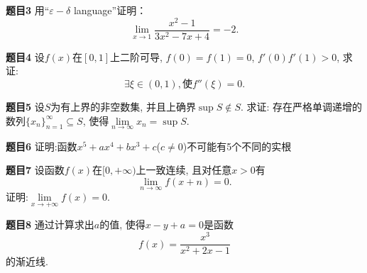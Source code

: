 \documentclass[aspectratio=43]{beamer}
\begin{document}
\begin{frame}{\textbf{题目3}}
	用“$\varepsilon-\delta$ language”证明：\begin{equation*}
	\lim_{x\to 1}\frac{x^2-1}{3x^2-7x+4} = -2.
	\end{equation*}
\end{frame}

\begin{frame}{\textbf{题目4}}
	设$f(x)$在$[0,1]$上二阶可导, $f(0) = f(1) = 0$, $f'(0)f'(1)>0$, 求证:
	\begin{equation*}
	\exists \xi\in(0,1), \text{使}f''(\xi) = 0.
	\end{equation*}
\end{frame}

\begin{frame}{\textbf{题目5}}
	设$S$为有上界的非空数集, 并且上确界$\sup S\notin S$. 求证: 存在严格单调递增的数列$\{x_n\}_{n=1}^{\infty}\subseteq S$, 使得$\lim\limits_{n\to\infty}x_n = \sup S$.
	
\end{frame}

\begin{frame}{\textbf{题目6}}
	证明:函数$x^5+ax^4+bx^3+c$($c\neq 0$)不可能有5个不同的实根
	
\end{frame}

\begin{frame}{\textbf{题目7}}
	设函数$f(x)$在$[0,+\infty)$上一致连续, 且对任意$x>0$有
	\begin{equation}
	\lim_{n\to\infty}f(x+n) = 0.
	\end{equation}
	证明:$\lim\limits_{x\to+\infty}f(x) = 0$.
	
\end{frame}

\begin{frame}{\textbf{题目8}}
	通过计算求出$a$的值, 使得$x-y+a = 0$是函数
	\begin{equation*}
	f(x) = \frac{x^3}{x^2+2x-1}
	\end{equation*}
	的渐近线.
\end{frame}
\end{document}
